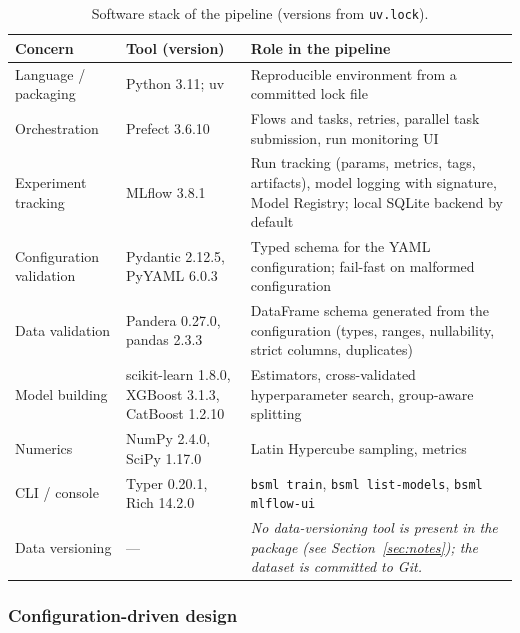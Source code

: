 \begin{table}[htbp]
  \centering
  \caption{Software stack of the pipeline (versions from \texttt{uv.lock}).}
  \label{tab:tools}
  \small
  \begin{tabular}{llp{6.8cm}}
    \toprule
    Concern & Tool (version) & Role in the pipeline \\
    \midrule
    Language / packaging & Python 3.11; uv & Reproducible environment from a committed lock file \\
    Orchestration & Prefect 3.6.10 & Flows and tasks, retries, parallel task submission, run monitoring UI \\
    Experiment tracking & MLflow 3.8.1 & Run tracking (params, metrics, tags, artifacts), model logging with signature, Model Registry; local SQLite backend by default \\
    Configuration validation & Pydantic 2.12.5, PyYAML 6.0.3 & Typed schema for the YAML configuration; fail-fast on malformed configuration \\
    Data validation & Pandera 0.27.0, pandas 2.3.3 & DataFrame schema generated from the configuration (types, ranges, nullability, strict columns, duplicates) \\
    Model building & scikit-learn 1.8.0, XGBoost 3.1.3, CatBoost 1.2.10 & Estimators, cross-validated hyperparameter search, group-aware splitting \\
    Numerics & NumPy 2.4.0, SciPy 1.17.0 & Latin Hypercube sampling, metrics \\
    CLI / console & Typer 0.20.1, Rich 14.2.0 & \texttt{bsml train}, \texttt{bsml list-models}, \texttt{bsml mlflow-ui} \\
    Data versioning & --- & \emph{No data-versioning tool is present in the package (see Section~\ref{sec:notes}); the dataset is committed to Git.} \\
    \bottomrule
  \end{tabular}
\end{table}

\subsubsection{Configuration-driven design}
\label{sec:methods:config}

